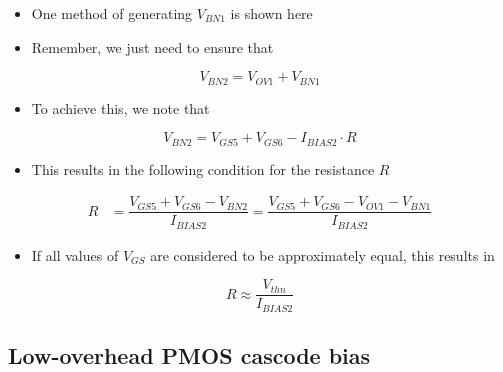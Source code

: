 \documentclass[11pt]{article}
\providecommand{\tightlist}{%
      \setlength{\itemsep}{0pt}\setlength{\parskip}{0pt}}
\begin{document}
    \begin{itemize}
\item
  One method of generating \(V_{BN1}\) is shown here
\item
  Remember, we just need to ensure that
\end{itemize}

\begin{equation}
V_{BN2} = V_{OV1} + V_{BN1}
\end{equation}

\begin{itemize}
\tightlist
\item
  To achieve this, we note that
\end{itemize}

\begin{equation}
V_{BN2} = V_{GS5} + V_{GS6} - I_{BIAS2}\cdot R
\end{equation}

\begin{itemize}
\tightlist
\item
  This results in the following condition for the resistance \(R\)
\end{itemize}

\begin{align}
R &= \dfrac{V_{GS5} + V_{GS6} - V_{BN2} }{I_{BIAS2}} = \dfrac{V_{GS5} + V_{GS6} - V_{OV1} - V_{BN1} }{I_{BIAS2}}
\end{align}

\begin{itemize}
\tightlist
\item
  If all values of \(V_{GS}\) are considered to be approximately equal,
  this results in
\end{itemize}

\begin{equation}
R \approx \dfrac{V_{thn}}{I_{BIAS2}}
\end{equation}

    \hypertarget{low-overhead-pmos-cascode-bias}{%
\subsection{Low-overhead PMOS cascode
bias}\label{low-overhead-pmos-cascode-bias}}
\end{document}

